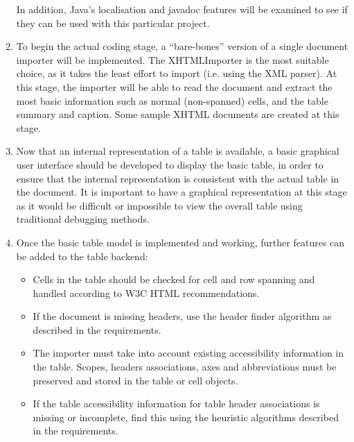 \begin{enumerate}
\begin{itemize}
\end{itemize}

In addition, Java's localisation and javadoc features will be examined to see
if they can be used with this particular project.

\item To begin the actual coding stage, a ``bare-bones'' version of a single
document importer will be implemented.  The XHTMLImporter is the most suitable
choice, as it takes the least effort to import (i.e. using the XML parser). At
this stage, the importer will be able to read the document and extract the most
basic information such as normal (non-spanned) cells, and the table summary and
caption. Some sample XHTML documents are created at this stage.

\item Now that an internal representation of a table is available, a basic
graphical user interface should be developed to display the basic table, in
order to ensure that the internal representation is consistent with the
actual table in the document. It is important to have a graphical representation
at this stage as it would be difficult or impossible to view the overall table using
traditional debugging methods.

\item Once the basic table model is implemented and working, further features
can be added to the table backend:

\begin{itemize}

\item Cells in the table should be checked for cell and row spanning and handled
according to W3C HTML recommendations\cite{w3c:xhtml}. 

\item If the document is missing headers, use the header finder algorithm as described
in the requirements.

\item The importer must take into account existing accessibility information in 
the table. Scopes, headers associations, axes and abbreviations must be preserved
and stored in the table or cell objects.

\item If the table accessibility information for table header associations is missing
or incomplete, find this using the heuristic algorithms described in the 
requirements.

\end{itemize}


\end{enumerate}
